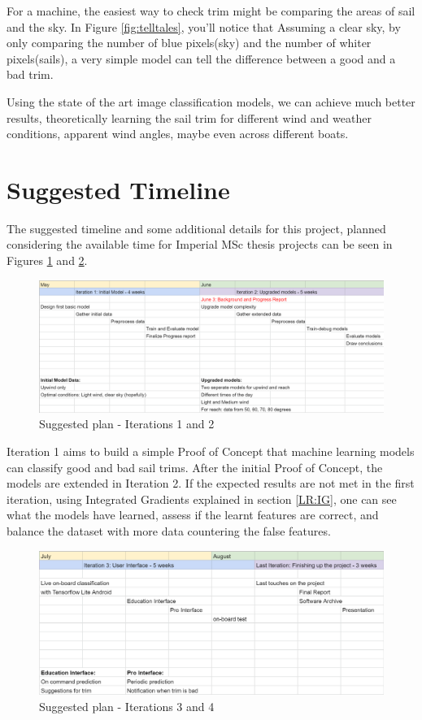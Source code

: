 For a machine, the easiest way to check trim might be comparing the areas of sail and the sky. In Figure \ref{fig:telltales}, you'll notice that Assuming a clear sky, by only comparing the number of blue pixels(sky) and the number of whiter pixels(sails), a very simple model can tell the difference between a good and a bad trim.

Using the state of the art image classification models, we can achieve much better results, theoretically learning the sail trim for different wind and weather conditions, apparent wind angles, maybe even across different boats.


\section{Suggested Timeline}

The suggested timeline and some additional details for this project, planned considering the available time for Imperial MSc thesis projects can be seen in Figures \ref{fig:sta-plan1} and \ref{fig:sta-plan2}.

\begin{figure}[h]
\centering
\includegraphics[width = \hsize]{figures/sail-trim-approach/plan1.png}
\caption{Suggested plan - Iterations 1 and 2}
\label{fig:sta-plan1}
\end{figure}

Iteration 1 aims to build a simple Proof of Concept that machine learning models can classify good and bad sail trims. After the initial Proof of Concept, the models are extended in Iteration 2. If the expected results are not met in the first iteration, using Integrated Gradients explained in section \ref{LR:IG}, one can see what the models have learned, assess if the learnt features are correct, and balance the dataset with more data countering the false features.

\begin{figure}[h]
\centering
\includegraphics[width = \hsize]{figures/sail-trim-approach/plan2.png}
\caption{Suggested plan - Iterations 3 and 4}
\label{fig:sta-plan2}
\end{figure}

